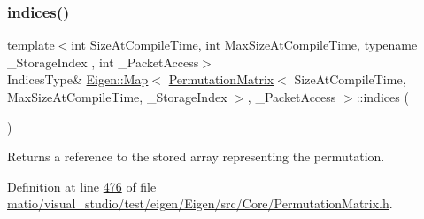 \mbox{\label{class_eigen_1_1_map_3_01_permutation_matrix_3_01_size_at_compile_time_00_01_max_size_at_compile_2f9d18bf0084dbfb13fbbfe14adaf22d_af9771ec7bda9dfc5c5a6cc9857410c4c}} 
\subsubsection{\texorpdfstring{indices()}{indices()}\hspace{0.1cm}{\footnotesize\ttfamily [4/4]}}
{\footnotesize\ttfamily template$<$int Size\+At\+Compile\+Time, int Max\+Size\+At\+Compile\+Time, typename \+\_\+\+Storage\+Index , int \+\_\+\+Packet\+Access$>$ \\
Indices\+Type\& \hyperlink{group___core___module_class_eigen_1_1_map}{Eigen\+::\+Map}$<$ \hyperlink{group___core___module_class_eigen_1_1_permutation_matrix}{Permutation\+Matrix}$<$ Size\+At\+Compile\+Time, Max\+Size\+At\+Compile\+Time, \+\_\+\+Storage\+Index $>$, \+\_\+\+Packet\+Access $>$\+::indices (\begin{DoxyParamCaption}{ }\end{DoxyParamCaption})\hspace{0.3cm}{\ttfamily [inline]}}

\begin{DoxyReturn}{Returns}
a reference to the stored array representing the permutation. 
\end{DoxyReturn}


Definition at line \hyperlink{matio_2visual__studio_2test_2eigen_2_eigen_2src_2_core_2_permutation_matrix_8h_source_l00476}{476} of file \hyperlink{matio_2visual__studio_2test_2eigen_2_eigen_2src_2_core_2_permutation_matrix_8h_source}{matio/visual\+\_\+studio/test/eigen/\+Eigen/src/\+Core/\+Permutation\+Matrix.\+h}.

